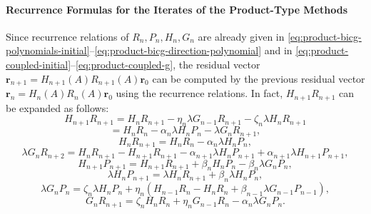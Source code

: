 \paragraph{{Recurrence Formulas for the Iterates of the Product-Type Methods}}\label{subsec:product-iterate-recurrences}\mbox{}\par
{Since recurrence relations of $R_n,P_n,H_n,G_n$ are already given in \eqref{eq:product-bicg-polynomials-initial}--\eqref{eq:product-bicg-direction-polynomial} and in \eqref{eq:product-coupled-initial}--\eqref{eq:product-coupled-g}, the residual vector $\bm r_{n+1}=H_{n+1}(A)R_{n+1}(A)\bm r_0$ can be computed by the previous residual vector $\bm r_n=H_n(A)R_n(A)\bm r_0$ using the recurrence relations. In fact, $H_{n+1}R_{n+1}$ can be expanded as follows:}
\begin{equation}\label{eq:product-polynomial-residual-three}H_{n+1}R_{n+1}=H_nR_{n+1}-\eta_n\lambda G_{n-1}R_{n+1}-\zeta_n\lambda H_nR_{n+1}\end{equation}
\begin{equation}\label{eq:product-polynomial-residual-two}=H_nR_n-\alpha_n\lambda H_nP_n-\lambda G_nR_{n+1},\end{equation}
\begin{equation}\label{eq:product-polynomial-t}H_nR_{n+1}=H_nR_n-\alpha_n\lambda H_nP_n,\end{equation}
\begin{equation}\label{eq:product-polynomial-y}\lambda G_nR_{n+2}=H_nR_{n+1}-H_{n+1}R_{n+1}-\alpha_{n+1}\lambda H_nP_{n+1}+\alpha_{n+1}\lambda H_{n+1}P_{n+1},\end{equation}
\begin{equation}\label{eq:product-polynomial-p}H_{n+1}P_{n+1}=H_{n+1}R_{n+1}+\beta_nH_nP_n-\beta_n\lambda G_nP_n,\end{equation}
\begin{equation}\label{eq:product-polynomial-w}\lambda H_nP_{n+1}=\lambda H_nR_{n+1}+\beta_n\lambda H_nP_n,\end{equation}
\begin{equation}\label{eq:product-polynomial-u}\lambda G_nP_n=\zeta_n\lambda H_nP_n+\eta_n(H_{n-1}R_n-H_nR_n+\beta_{n-1}\lambda G_{n-1}P_{n-1}),\end{equation}
\begin{equation}\label{eq:product-polynomial-z}G_nR_{n+1}=\zeta_nH_nR_n+\eta_nG_{n-1}R_n-\alpha_n\lambda G_nP_n.\end{equation}
